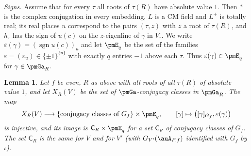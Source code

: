\documentclass[10pt]{amsart}
\newtheorem{lemma}[theorem]{Lemma}
\theoremstyle{definition}
\theoremstyle{remark}
\begin{document}
\emph{Signs.} Assume that for every $\tau$ all roots of $\tau(R)$ have absolute value $1$. Then
$*$ is the complex conjugation in every embedding, $L$ is a CM field and $L^+$ is totally real;
its real places $u$ correspond to the pairs $(\tau,z)$ with $z$ a root of $\tau(R)$, and
$h_\tau$ has the sign of $u(c)$ on the $z$-eigenline of $\gamma$ in $V_\tau$. We write
$\varepsilon(\gamma)=(\operatorname{sgn}u(c))_u$ and let $\pmE_q$ be the set of the families
$\varepsilon=(\varepsilon_u)\in\{\pm1\}^{\{u\}}$ with exactly $q$ entries $-1$ above each $\tau$.
Thus $\varepsilon(\gamma)\in\pmE_q$ for $\gamma\in\pmGa_R$.

\begin{lemma}\label{pm:classes}
Let $f$ be even, $R$ as above with all roots of all $\tau(R)$ of absolute value $1$, and let
$X_R(V)$ be the set of $\pmGa$-conjugacy classes in $\pmGa_R$. The map
\[
X_R(V)\longrightarrow\{\text{conjugacy classes of }G_f\}\times\pmE_q,\qquad
[\gamma]\mapsto\bigl([\gamma]_{G_f},\varepsilon(\gamma)\bigr)
\]
is injective, and its image is $\mathsf C_R\times\pmE_q$ for a set $\mathsf C_R$ of conjugacy
classes of $G_f$. The set $\mathsf C_R$ is the same for $V$ and for $V'$ (with $G_{V'}(\auA_{F,f})$
identified with $G_f$ by $\iota$).
\end{lemma}
\end{document}
